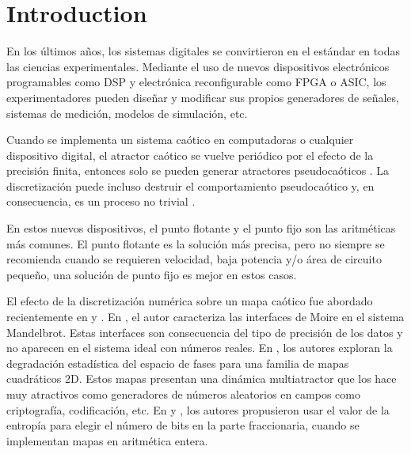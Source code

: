 \section{Introduction}

En los últimos años, los sistemas digitales se convirtieron en el estándar en todas las ciencias experimentales.
Mediante el uso de nuevos dispositivos electrónicos programables como DSP y electrónica reconfigurable como FPGA o ASIC, los experimentadores pueden diseñar y modificar sus propios generadores de señales, sistemas de medición, modelos de simulación, etc.

Cuando se implementa un sistema caótico en computadoras o cualquier dispositivo digital, el atractor caótico se vuelve periódico por el efecto de la precisión finita, entonces solo se pueden generar atractores pseudocaóticos \cite{Alcover2017, Dias2011}.
La discretización puede incluso destruir el comportamiento pseudocaótico y, en consecuencia, es un proceso no trivial \cite{Azzaz2013, Hoover2017, DeMicco2017}.

En estos nuevos dispositivos, el punto flotante y el punto fijo son las aritméticas más comunes.
El punto flotante es la solución más precisa, pero no siempre se recomienda cuando se requieren velocidad, baja potencia y/o área de circuito pequeño, una solución de punto fijo es mejor en estos casos.

El efecto de la discretización numérica sobre un mapa caótico fue abordado recientemente en \cite{Alcover2017} y \cite{DeMicco2017}.
En \cite{Alcover2017}, el autor caracteriza las interfaces de Moire en el sistema Mandelbrot.
Estas interfaces son consecuencia del tipo de precisión de los datos y no aparecen en el sistema ideal con números reales.
En \cite{DeMicco2017}, los autores exploran la degradación estadística del espacio de fases para una familia de mapas cuadráticos 2D.
Estos mapas presentan una dinámica multiatractor que los hace muy atractivos como generadores de números aleatorios en campos como criptografía, codificación, etc. En \cite{Tlelo-Cuautle2016} y \cite{DelaFraga2017}, los autores propusieron usar el valor de la entropía para elegir el número de bits en la parte fraccionaria, cuando se implementan mapas en aritmética entera.

